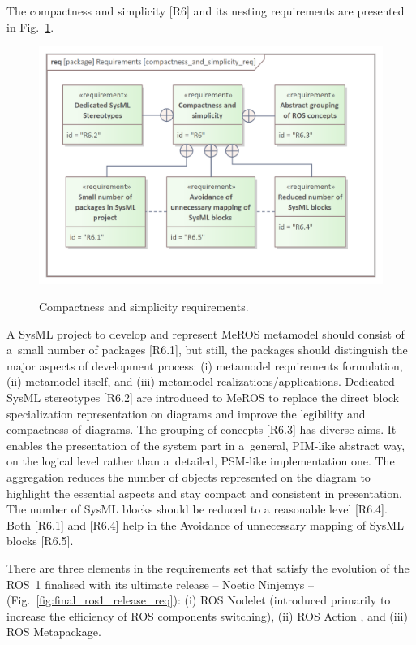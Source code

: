 \documentclass{ieeeaccess}
\begin{document}
	The compactness and simplicity [R6] and its nesting requirements are presented in Fig.~\ref{fig:compactness_and_simplicity_req}. 
	
	\begin{figure}[htb]
		\centering
		\begin{center}
			{\includegraphics[scale=0.69]{img/requirement_pkg/compactness_and_simplicity_req.png}}
		\end{center}
		\caption{Compactness and simplicity requirements.} 
		\label{fig:compactness_and_simplicity_req}
	\end{figure}
	
	A SysML project to develop and represent MeROS metamodel should consist of a~small number of packages [R6.1], but still, the packages should distinguish the major aspects of development process: (i) metamodel requirements formulation, (ii) metamodel itself, and (iii) metamodel realizations/applications.
	Dedicated SysML stereotypes [R6.2] are introduced to MeROS to replace the direct block specialization representation on diagrams and improve the legibility and compactness of diagrams.
	The grouping of concepts [R6.3] has diverse aims. It enables the presentation of the system part in a~general, PIM-like abstract way, on the logical level rather than a~detailed, PSM-like implementation one. The aggregation reduces the number of objects represented on the diagram to highlight the essential aspects and stay compact and consistent in presentation.
	The number of SysML blocks should be reduced to a reasonable level [R6.4]. Both [R6.1] and [R6.4] help in the Avoidance of unnecessary mapping of SysML blocks [R6.5].

	There are three elements in the requirements set that satisfy the evolution of the ROS~1  finalised with its ultimate release -- Noetic Ninjemys -- (Fig.~\ref{fig:final_ros1_release_req}): (i) ROS Nodelet  (introduced primarily to increase the efficiency of ROS components switching), (ii) ROS Action , and (iii) ROS Metapackage.
	
\end{document}

